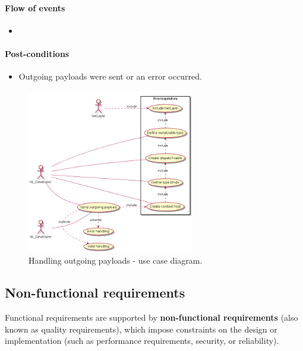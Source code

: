 \documentclass[12pt]{report}
\renewcommand\emph{\textbf}
\begin{document}
                    \paragraph{Flow of events}
                        \begin{itemize}
                            \item
                        \end{itemize}

                    \paragraph{Post-conditions}
                        \begin{itemize}
                            \item Outgoing payloads were sent or an error occurred.
                        \end{itemize}

                    \begin{figure}[H]
                    \caption{Handling outgoing payloads - use case diagram.}
                    \centering
                    \includegraphics[width=0.65\textwidth]{d/uc/outgoing.png}
                    \end{figure}



            \newpage

            \subsection{Non-functional requirements}
                Functional requirements are supported by \emph{non-functional requirements} (also known as quality requirements), which impose constraints on the design or implementation (such as performance requirements, security, or reliability).
\end{document}
